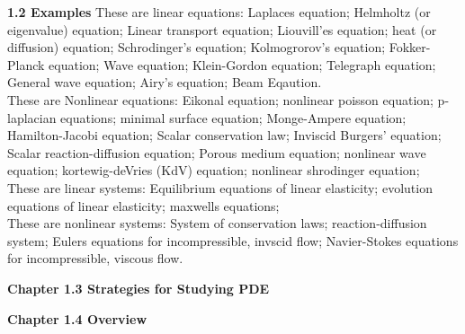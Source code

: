 \documentclass{article}
\begin{document}
\textbf {1.2 Examples} These are linear equations: Laplaces equation; Helmholtz (or eigenvalue) equation; Linear transport equation; Liouvill'es equation; heat (or diffusion) equation; Schrodinger's equation; Kolmogrorov's equation; Fokker-Planck equation; Wave equation; Klein-Gordon equation; Telegraph equation; General wave equation; Airy's equation; Beam Eqaution. \\
These are Nonlinear equations: Eikonal equation; nonlinear poisson equation; p-laplacian equations; minimal surface equation; Monge-Ampere equation; Hamilton-Jacobi equation; Scalar conservation law; Inviscid Burgers' equation; Scalar reaction-diffusion equation; Porous medium equation; nonlinear wave equation; kortewig-deVries (KdV) equation; nonlinear shrodinger equation; \\
These are linear systems: Equilibrium equations of linear elasticity; evolution equations of linear elasticity; maxwells equations; \\
These are nonlinear systems: System of conservation laws; reaction-diffusion system; Eulers equations for incompressible, invscid flow; Navier-Stokes equations for incompressible, viscous flow.

\textbf {Chapter 1.3 Strategies for Studying PDE}

\textbf {Chapter 1.4 Overview}
\end{document}
